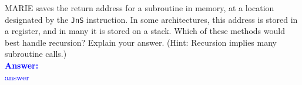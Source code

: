 \item{}
MARIE saves the return address for a subroutine in memory, at a location
designated by the {\tt JnS} instruction. In some architectures, this address
is stored in a register, and in many it is stored on a stack. Which of these
methods would best handle recursion? Explain your answer. (Hint: Recursion
implies many subroutine calls.)\\[12pt]
\ifanswers
\textcolor{blue}{
\textbf{Answer:}\\
answer
}
\newpage
\fi

